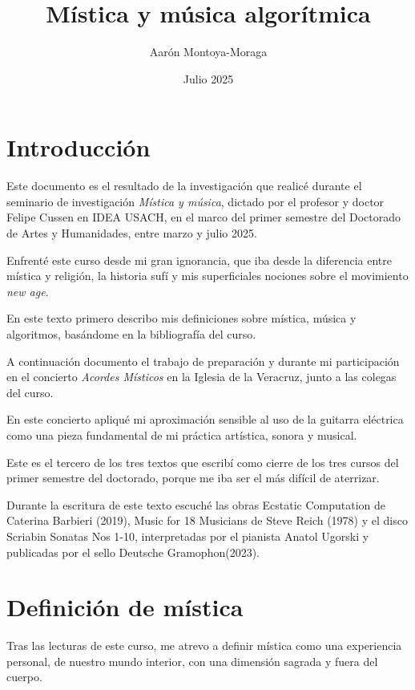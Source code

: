 \documentclass{article}
\title{Mística y música algorítmica}
\author{Aarón Montoya-Moraga}
\date{Julio 2025}
\begin{document}
\maketitle

\renewcommand*\contentsname{Tabla de contenidos}

\tableofcontents

\clearpage

\section{Introducción}

Este documento es el resultado de la investigación que realicé durante el seminario de investigación \textit{Mística y música}, dictado por el profesor y doctor Felipe Cussen en IDEA USACH, en el marco del primer semestre del Doctorado de Artes y Humanidades, entre marzo y julio 2025.

Enfrenté este curso desde mi gran ignorancia, que iba desde la diferencia entre mística y religión, la historia sufí y mis superficiales nociones sobre el movimiento \textit{new age}.

En este texto primero describo mis definiciones sobre mística, música y algoritmos, basándome en la bibliografía del curso. 

A continuación documento el trabajo de preparación y durante mi participación en el concierto \textit{Acordes Místicos} en la Iglesia de la Veracruz, junto a las colegas del curso.

En este concierto apliqué mi aproximación sensible al uso de la guitarra eléctrica como una pieza fundamental de mi práctica artística, sonora y musical.

Este es el tercero de los tres textos que escribí como cierre de los tres cursos del primer semestre del doctorado, porque me iba ser el más difícil de aterrizar.

Durante la escritura de este texto escuché las obras Ecstatic Computation de Caterina Barbieri (2019), Music for 18 Musicians de Steve Reich (1978) y el disco Scriabin Sonatas Nos 1-10, interpretadas por el pianista Anatol Ugorski y publicadas por el sello Deutsche Gramophon(2023).

\clearpage

\section{Definición de mística}

Tras las lecturas de este curso, me atrevo a definir mística como una experiencia personal, de nuestro mundo interior, con una dimensión sagrada y fuera del cuerpo.
\end{document}
